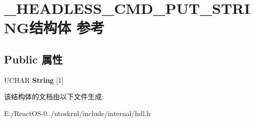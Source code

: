 \hypertarget{struct___h_e_a_d_l_e_s_s___c_m_d___p_u_t___s_t_r_i_n_g}{}\section{\+\_\+\+H\+E\+A\+D\+L\+E\+S\+S\+\_\+\+C\+M\+D\+\_\+\+P\+U\+T\+\_\+\+S\+T\+R\+I\+N\+G结构体 参考}
\label{struct___h_e_a_d_l_e_s_s___c_m_d___p_u_t___s_t_r_i_n_g}
\subsection*{Public 属性}
\begin{DoxyCompactItemize}
\item 
\mbox{\label{struct___h_e_a_d_l_e_s_s___c_m_d___p_u_t___s_t_r_i_n_g_a5bd7c0feab467a62f10581a0fe8b5b85}} 
U\+C\+H\+AR {\bfseries String} \mbox{[}1\mbox{]}
\end{DoxyCompactItemize}


该结构体的文档由以下文件生成\+:\begin{DoxyCompactItemize}
\item 
E\+:/\+React\+O\+S-\/0../ntoskrnl/include/internal/hdl.\+h\end{DoxyCompactItemize}
